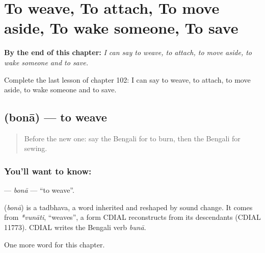 
\chapter{To weave, To attach, To move aside, To wake someone, To save}
\label{ch:bn-to-weave-to-attach-to-move-aside-to-wake-someone-to-save}

\begin{chapteropening}
\textbf{By the end of this chapter:} \emph{I can say to weave, to attach, to move aside, to wake someone and to save.}

Complete the last lesson of chapter 102: I can say to weave, to attach, to move aside, to wake someone and to save.
\end{chapteropening}

\section[\texorpdfstring{\bn{বোনা} (bonā)}{বোনা (bonā)}]{ (bonā) — to weave}

\label{lesson:BN-C102-bona}



\begin{quote}
Before the new one: say the Bengali for to burn, then the Bengali for sewing.
\end{quote}

\subsection*{You'll want to know: }
\textbf{} — \emph{bonā} — \textquotedblleft{}to weave\textquotedblright{}.

\begin{cousinweb}
\textbf{} (\emph{bonā}) is a tadbhava, a word inherited and reshaped by sound change. It comes from \emph{*vunāti}, \textquotedblleft{}weaves\textquotedblright{}, a form CDIAL reconstructs from its descendants (CDIAL 11773). CDIAL writes the Bengali verb \emph{bunā}.
\end{cousinweb}

\begin{grammarlens}[title={What you've built}]
One more word for this chapter.
\end{grammarlens}

